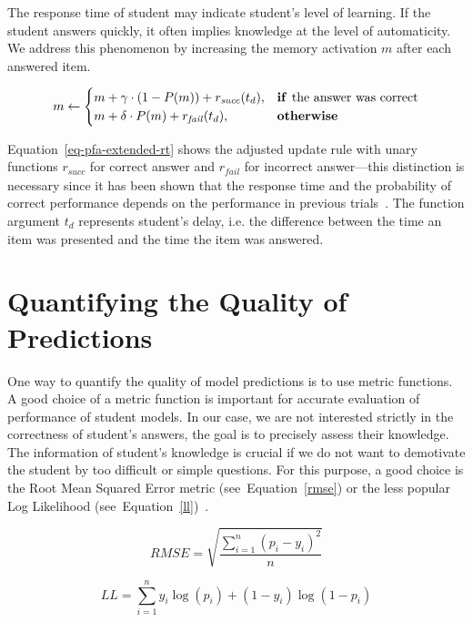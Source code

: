 The response time of student may indicate student's level of learning. If the student answers quickly, it often implies knowledge at the level of automaticity. We address this phenomenon by increasing the memory activation $m$ after each answered item.

\begin{equation} \label{eq-pfa-extended-rt}
  m \gets \begin{cases}
            m + \gamma \cdot (1 - P(m)) + r_{\mathit{succ}}(t_d), & \text{\textbf{if }} \text{the answer was correct} \\
            m + \delta \cdot P(m) + r_{\mathit{fail}}(t_d), & \text{\textbf{otherwise}}
          \end{cases}
\end{equation}

Equation~\ref{eq-pfa-extended-rt} shows the adjusted update rule with unary functions $r_{\mathit{succ}}$ for correct answer and $r_{\mathit{fail}}$ for incorrect answer---this distinction is necessary since it has been shown that the response time and the probability of correct performance depends on the performance in previous trials~\cite{papouvsekanalysis}. The function argument $t_d$ represents student's delay, i.e. the difference between the time an item was presented and the time the item was answered.

\section{Quantifying the Quality of Predictions}
\label{metrics}

One way to quantify the quality of model predictions is to use metric functions. A good choice of a metric function is important for accurate evaluation of performance of student models. In our case, we are not interested strictly in the correctness of student's answers, the goal is to precisely assess their knowledge. The information of student's knowledge is crucial if we do not want to demotivate the student by too difficult or simple questions. For this purpose, a good choice is the Root Mean Squared Error metric (see~Equation~\ref{rmse}) or the less popular Log Likelihood (see~Equation~\ref{ll})~\cite{Pelanek2015a}.

\begin{equation} \label{rmse}
  RMSE = \sqrt{\frac{\sum_{i=1}^n (p_i - y_i)^2}{n}}
\end{equation}

\begin{equation} \label{ll}
  LL = \sum_{i=1}^n y_i \log(p_i) + (1 - y_i) \log(1 - p_i)
\end{equation}

